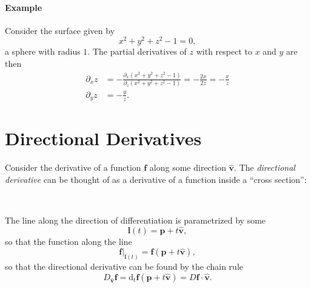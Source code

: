 \documentclass[11pt]{article}
\newcommand{\uvec}[1]{\mathbf{\hat{#1}}}
\renewcommand{\vec}[1]{\mathbf{#1}}
\begin{document}
\paragraph{Example}

Consider the surface given by 
\[
    x^2 + y^2 + z^2 - 1 = 0,
\]
a sphere with radius \(1\). The partial derivatives of \(z\) with respect to \(x\) and \(y\) are then
\begin{align*}
    \partial_x z &= - \frac{\partial_x (x^2 + y^2 + z^2 - 1)}{\partial_z (x^2 + y^2 + z^2 - 1)} = - \frac{2x}{2z} = - \frac x z \\
    \partial_y z &= - \frac y z.
\end{align*}





\section*{Directional Derivatives}


Consider the derivative of a function \(\vec f\) along some direction \(\uvec v\). The \emph{directional derivative} can be thought of as a derivative of a function inside a ``cross section'':
\begin{center}
     \\
    \begin{tikzpicture}
        
    \end{tikzpicture}
\end{center}

The line along the direction of differentiation is parametrized by some
\[
    \vec l(t) = \vec p + t \uvec v,
\]
so that the function along the line
\[
    \vec f \big|_{\vec l(t)} = \vec f(\vec p + t \uvec v),
\]
so that the directional derivative can be found by the chain rule
\[
    D_{\uvec v} \vec f = \mathrm d_t \vec f(\vec p + t \uvec v) = D \vec f \cdot \uvec v.
\]
\end{document}
